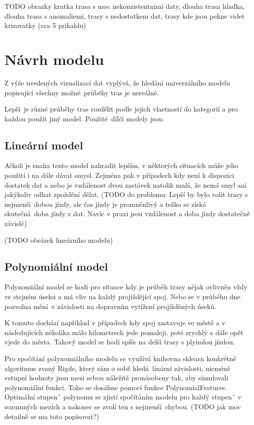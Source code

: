 TODO obrazky kratka trasa s moc nekonzistentnimi daty, dlouha trasa hladka, dlouha trasa s anomaliemi, trasy s nedostatkem dat, trasy kde jsou pekne videt krizovatky (cca 5 prikaldu)


\section{Návrh modelu}

Z výše uvedených vizualizací dat vyplývá, že hledání univerzálního modelu popisující všechny možné průběhy tras je nereálné.

\bigbreak

Lepší je různé průběhy tras rozdělit podle jejich vlastností do kategorií a pro každou použít jiný model. Použité dílčí modely jsou:


\subsection{Lineární model}

Ačkoli je snaha tento model nahradit lepším, v některých situacích může jeho použití i na dále dávat smysl. Zejména pak v případech kdy není k dispozici dostatek dat a nebo je vzdálenost dvou zastávek natolik malá, že nemá smyl ani jakýkoliv odhat zpoždění dělat. (TODO do problemu: Lepší by bylo volit trasy s nejmenší dobou jízdy, ale čas jízdy je promněnlivý a težko se získá skutečná doba jízdy z dat. Navíc v praxi jsou vzdálenost a doba jízdy dostatečně závislé)

(TODO obrázek lineárního modelu)


\subsection{Polynomiální model}

Polynomiální model se hodí pro situace kdy je průběh trasy nějak ovlivněn vždy ve stejném úseku a má vliv na každý projíždějící spoj. Nebo se v průběhu dne pozvolna mění v závislosti na dopravním vytížení projížděných úseků.

\bigbreak

K tomuto dochází například v případech kdy spoj zastavuje ve městě a v následujících několika málo kilometrech jede pomaleji, poté zrychlý a dále opět vjede do města. Takový model se hodí spíše na delší trasy s plynulou jízdou.

\bigbreak

Pro spočítání polynomiálního modelu se využívá knihovna sklearn konkrétně algoritmus zvaný Rigde, který sám o sobě hledá linární závislosti, nicméně vstupní hodnoty jsou mezi sebou náležitě pronásobeny tak, aby simulovali polynomiální funkci. Toho se dosáhne pomocí funkce PolynomialFeatures. Optimální stupenˇ polynomu se zjistí spočítáním modelu pro každý stupenˇ v rozumných mezích a nakonec se zvolí ten s nejmenší chybou. (TODO jak moc detailně se ma toto popisovat?)

